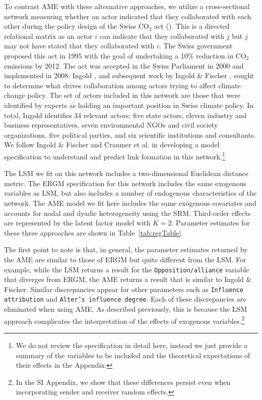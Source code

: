 \documentclass[12pt,pdflatex]{elsarticle}
\begin{document}
To contrast AME with these alternative approaches, we utilize a cross-sectional network measuring whether an actor indicated that they collaborated with each other during the policy design of the Swiss CO$_{2}$ act (\citealt{ingold:2008}). This is a directed relational matrix as an actor $i$ can indicate that they collaborated with $j$ but $j$ may not have stated that they collaborated with $i$. The Swiss government proposed this act in 1995 with the goal of undertaking a 10\% reduction in CO$_{2}$ emissions by 2012. The act was accepted in the Swiss Parliament in 2000 and implemented in 2008. Ingold \cite{ingold:2008}, and subsequent work by Ingold \& Fischer \cite{ingold:fischer:2014}, sought to determine what drives collaboration among actors trying to affect climate change policy. The set of actors included in this network are those that were identified by experts as holding an important position in Swiss climate policy. In total, Ingold identifies 34 relevant actors: five state actors, eleven industry and business representatives, seven environmental NGOs and civil society organizations, five political parties, and six scientific institutions and consultants. We follow Ingold \& Fischer and Cranmer et al. \cite{cranmer:etal:2016} in developing a model specification to understand and predict link formation in this network.\footnote{We do not review the specification in detail here, instead we just provide a summary of the variables to be included and the theoretical expectations of their effects in the Appendix.}

The LSM we fit on this network includes a two-dimensional Euclidean distance metric. The ERGM specification for this network includes the same exogenous variables as LSM, but also includes a number of endogenous characteristics of the network. The AME model we fit here includes the same exogenous covariates and accounts for nodal and dyadic heterogeneity using the SRM. Third-order effects are represented by the latent factor model with $K=2$. Parameter estimates for these three approaches are shown in Table~\ref{tab:regTable}.

The first point to note is that, in general, the parameter estimates returned by the AME are similar to those of ERGM but quite different from the LSM. For example, while the LSM returns a result for the \texttt{Opposition/alliance} variable that diverges from ERGM, the AME returns a result that is similar to Ingold \& Fischer. Similar discrepancies appear for other parameters such as \texttt{Influence attribution} and \texttt{Alter's influence degree}. Each of these discrepancies are eliminated when using AME. As described previously, this is because the LSM approach complicates the interpretation of the effects of exogenous variables.\footnote{In the SI Appendix, we show that these differences persist even when incorporating sender and receiver random effects.}
\end{document}
